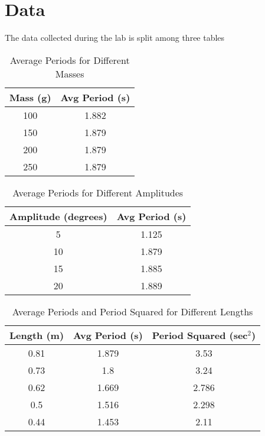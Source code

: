 \documentclass{report}
\begin{document}
    \section{Data}
    \bigbreak \noindent 
    The data collected during the lab is split among three tables
    \bigbreak \noindent 
    \begin{table}[h]
        \centering
        \begin{tabular}{cc}
            \toprule
            Mass (g) & Avg Period (s) \\
            \midrule
            100 & 1.882 \\
            150 & 1.879 \\
            200 & 1.879 \\
            250 & 1.879 \\
            \bottomrule
        \end{tabular}
        \caption{Average Periods for Different Masses}
    \end{table}
    \bigbreak \noindent 
    \begin{table}[h]
        \centering
        \begin{tabular}{cc}
            \toprule
            Amplitude (degrees) & Avg Period (s) \\
            \midrule
            5 & 1.125 \\
            10 & 1.879 \\
            15 & 1.885 \\
            20 & 1.889 \\
            \bottomrule
        \end{tabular}
        \caption{Average Periods for Different Amplitudes}
    \end{table}
    \bigbreak \noindent 
    \begin{table}[h]
        \centering
        \begin{tabular}{ccc}
            \toprule
            Length (m) & Avg Period (s) & Period Squared (sec\(^2\)) \\
            \midrule
            0.81 & 1.879 & 3.53 \\
            0.73 & 1.8 & 3.24 \\
            0.62 & 1.669 & 2.786 \\
            0.5 & 1.516 & 2.298 \\
            0.44 & 1.453 & 2.11 \\
            \bottomrule
        \end{tabular}
        \caption{Average Periods and Period Squared for Different Lengths}
    \end{table}
\end{document}
